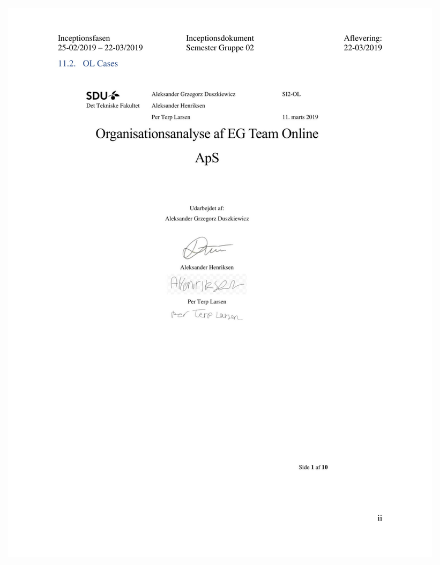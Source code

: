 \begin{figure}[hb]
  \includegraphics[scale = 0.33]{./PNG/Inceptions/Gruppe02+InceptionsDokument-35.jpg} 
\end{figure}

